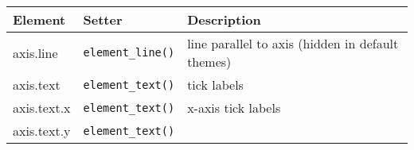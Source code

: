 \begin{longtable}[c]{@{}lll@{}}
\toprule
\begin{minipage}[b]{0.27\columnwidth}\raggedright\strut
Element
\strut\end{minipage} &
\begin{minipage}[b]{0.25\columnwidth}\raggedright\strut
Setter
\strut\end{minipage} &
\begin{minipage}[b]{0.35\columnwidth}\raggedright\strut
Description
\strut\end{minipage}\tabularnewline
\midrule
\endhead
\begin{minipage}[t]{0.27\columnwidth}\raggedright\strut
axis.line
\strut\end{minipage} &
\begin{minipage}[t]{0.25\columnwidth}\raggedright\strut
\texttt{element\_line()}
\strut\end{minipage} &
\begin{minipage}[t]{0.35\columnwidth}\raggedright\strut
line parallel to axis (hidden in default themes)
\strut\end{minipage}\tabularnewline
\begin{minipage}[t]{0.27\columnwidth}\raggedright\strut
axis.text
\strut\end{minipage} &
\begin{minipage}[t]{0.25\columnwidth}\raggedright\strut
\texttt{element\_text()}
\strut\end{minipage} &
\begin{minipage}[t]{0.35\columnwidth}\raggedright\strut
tick labels
\strut\end{minipage}\tabularnewline
\begin{minipage}[t]{0.27\columnwidth}\raggedright\strut
axis.text.x
\strut\end{minipage} &
\begin{minipage}[t]{0.25\columnwidth}\raggedright\strut
\texttt{element\_text()}
\strut\end{minipage} &
\begin{minipage}[t]{0.35\columnwidth}\raggedright\strut
x-axis tick labels
\strut\end{minipage}\tabularnewline
\begin{minipage}[t]{0.27\columnwidth}\raggedright\strut
axis.text.y
\strut\end{minipage} &
\begin{minipage}[t]{0.25\columnwidth}\raggedright\strut
\texttt{element\_text()}
\strut\end{minipage} &

\end{longtable}
